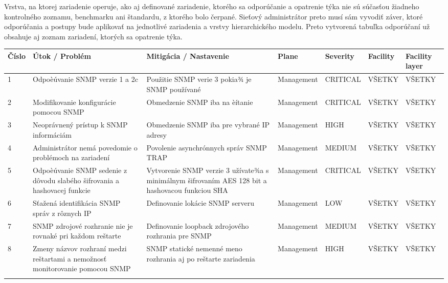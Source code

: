 Vrstva, na ktorej zariadenie operuje, ako aj definované zariadenie, ktorého sa odporúčanie a opatrenie týka nie sú súčasťou žiadneho kontrolného zoznamu, benchmarku ani štandardu, z ktorého bolo čerpané. Sieťový administrátor preto musí sám vyvodiť záver, ktoré odporúčania a postupy bude aplikovať na jednotlivé zariadenia a vrstvy hierarchického modelu. Preto vytvorená tabuľka odporúčaní už obsahuje aj zoznam zariadení, ktorých sa opatrenie týka.

\newpage

	\footnotesize
\begin{longtable}[htbp]{|C{2em}L{5.43em}L{5.43em}C{6em}C{5.43em}C{5.43em}C{5.43em}|}
	\hline
	\centering
		Číslo & {Útok / Problém} & Mitigácia / Nastavenie & Plane & Severity & Facility & Facility layer \\ \hline

		1 & Odpoèúvanie SNMP verzie 1 a 2c & Použitie SNMP verie 3 pokia¾ je SNMP používané & Management & CRITICAL & VŠETKY & VŠETKY \\
		 2 & Modifikovanie konfigurácie pomocou SNMP & Obmedzenie SNMP iba na èítanie & Management & CRITICAL & VŠETKY & VŠETKY \\
		3     & Neoprávnený prístup k SNMP informáciám & Obmedzenie SNMP iba pre vybrané IP adresy & Management & HIGH  & VŠETKY & VŠETKY \\
		 4     & Administrátor nemá povedomie o problémoch na zariadení & Povolenie asynchrónnych správ SNMP TRAP & Management & MEDIUM & VŠETKY & VŠETKY \\
		5     & Odpoèúvanie SNMP sedenie z dôvodu slabého šifrovania a hashovacej  funkcie & Vytvorenie SNMP verzie 3 užívate¾a s minimálnym šifrovaním AES 128 bit a hashovacou funkciou SHA & Management & CRITICAL & VŠETKY & VŠETKY \\
		 6     & Sťažená identifikácia SNMP správ z rôznych IP & Definovanie lokácie SNMP serveru & Management & LOW   & VŠETKY & VŠETKY \\
		7     & SNMP zdrojové rozhranie nie je rovnaké pri každom reštarte & Definovanie loopback zdrojového rozhrania pre SNMP & Management & MEDIUM & VŠETKY & VŠETKY \\
		 8     & Zmeny názvov rozhraní medzi reštartami a nemožnosť monitorovanie pomocou SNMP & SNMP statické nemenné meno rozhrania aj po reštarte zariadenia & Management & HIGH  & VŠETKY & VŠETKY \\
	\label{tab:addlabel1}%
\end{longtable}%

